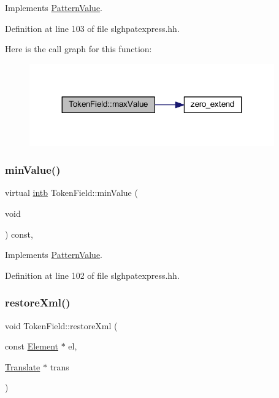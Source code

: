 Implements \mbox{\hyperlink{class_pattern_value_a865e8f34e031ef31f77dcaa93d76820d}{Pattern\+Value}}.



Definition at line 103 of file slghpatexpress.\+hh.

Here is the call graph for this function\+:
\nopagebreak
\begin{figure}[H]
\begin{center}
\leavevmode
\includegraphics[width=299pt]{class_token_field_ad42951c882a6013b44a7632fc60ae5d6_cgraph}
\end{center}
\end{figure}
\mbox{\label{class_token_field_a9b632778768fcc9d396ef12890ada93b}} 
\subsubsection{\texorpdfstring{minValue()}{minValue()}}
{\footnotesize\ttfamily virtual \mbox{\hyperlink{types_8h_aa925ba3e627c2df89d5b1cfe84fb8572}{intb}} Token\+Field\+::min\+Value (\begin{DoxyParamCaption}\item[{void}]{ }\end{DoxyParamCaption}) const\hspace{0.3cm}{\ttfamily [inline]}, {\ttfamily [virtual]}}



Implements \mbox{\hyperlink{class_pattern_value_a0dbf85240fe6310e36596fea3bb02f2e}{Pattern\+Value}}.



Definition at line 102 of file slghpatexpress.\+hh.

\mbox{\label{class_token_field_a6c2c56a97eeb763ee32c4d66770e1c2f}} 
\subsubsection{\texorpdfstring{restoreXml()}{restoreXml()}}
{\footnotesize\ttfamily void Token\+Field\+::restore\+Xml (\begin{DoxyParamCaption}\item[{const \mbox{\hyperlink{class_element}{Element}} $\ast$}]{el,  }\item[{\mbox{\hyperlink{class_translate}{Translate}} $\ast$}]{trans }\end{DoxyParamCaption})\hspace{0.3cm}{\ttfamily [virtual]}}



